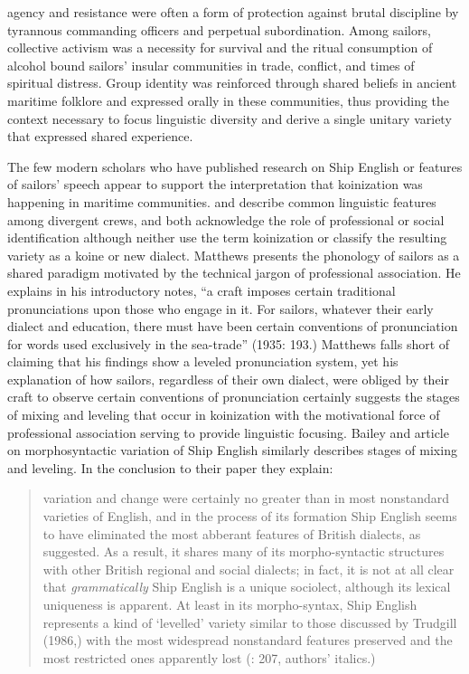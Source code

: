 agency and resistance were often a form of protection against brutal discipline by tyrannous commanding officers and perpetual subordination. Among sailors, collective activism was a necessity for survival and the ritual consumption of alcohol bound sailors’ insular communities in trade, conflict, and times of spiritual distress. Group identity was reinforced through shared beliefs in ancient maritime folklore and expressed orally in these communities, thus providing the context necessary to focus linguistic diversity and derive a single unitary variety that expressed shared experience. 


The few modern scholars who have published research on Ship English or features of sailors’ speech appear to support the interpretation that koinization was happening in maritime communities. \citet{Matthews1935} and \citet{BaileyRoss1988} describe common linguistic features among divergent crews, and both acknowledge the role of professional or social identification although neither use the term koinization or classify the resulting variety as a koine or new dialect. Matthews presents the phonology of sailors as a shared paradigm motivated by the technical jargon of professional association. He explains in his introductory notes, “a craft imposes certain traditional pronunciations upon those who engage in it. For sailors, whatever their early dialect and education, there must have been certain conventions of pronunciation for words used exclusively in the sea-trade” (1935: 193.) Matthews falls short of claiming that his findings show a leveled pronunciation system, yet his explanation of how sailors, regardless of their own dialect, were obliged by their craft to observe certain conventions of pronunciation certainly suggests the stages of mixing and leveling that occur in koinization with the motivational force of professional association serving to provide linguistic focusing. Bailey and  article on morphosyntactic variation of Ship English similarly describes stages of mixing and leveling. In the conclusion to their paper they explain: 


\begin{quotation}
variation and change were certainly no greater than in most nonstandard varieties of English, and in the process of its formation Ship English seems to have eliminated the most abberant features of British dialects, as \citet{Hancock1976} suggested. As a result, it shares many of its morpho-syntactic structures with other British regional and social dialects; in fact, it is not at all clear that \textit{grammatically} Ship English is a unique sociolect, although its lexical uniqueness is apparent. At least in its morpho-syntax, Ship English represents a kind of ‘levelled’ variety similar to those discussed by Trudgill (1986,) with the most widespread nonstandard features preserved and the most restricted ones apparently lost (\citealt{BaileyRoss1988}: 207, authors’ italics.) \end{quotation}

